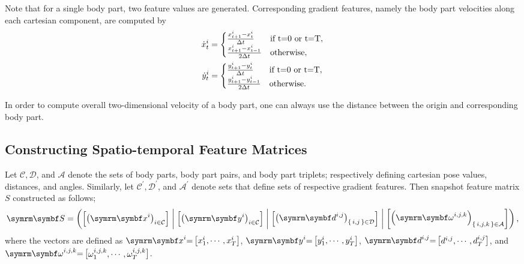 Note that for a single body part, two feature values are generated.
Corresponding gradient features, namely the body part velocities along each cartesian component, are computed by
\begin{equation}
	\begin{aligned}
		\dot{x}^{i}_t & = \begin{cases} \frac{x^{i}_{t+1} - x^{i}_{t}}{\Delta t} & \textnormal{if } $t=0$ \textnormal{ or } $t=T$, \\ \frac{x^{i}_{t+1} - x^{i}_{t-1}}{2\Delta t} & \textnormal{otherwise}, \end{cases} \\
		\dot{y}^{i}_t & = \begin{cases} \frac{y^{i}_{t+1} - y^{i}_{t}}{\Delta t} & \textnormal{if } $t=0$ \textnormal{ or } $t=T$, \\ \frac{y^{i}_{t+1} - y^{i}_{t-1}}{2\Delta t} & \textnormal{otherwise}. \end{cases}
	\end{aligned}
\end{equation}

In order to compute overall two-dimensional velocity of a body part, one can always use the distance between the origin and corresponding body part.

\subsection{Constructing Spatio-temporal Feature Matrices}
Let $\mathcal{C}, \mathcal{D}$, and $\mathcal{A}$ denote the sets of body parts, body part pairs, and body part triplets; respectively defining cartesian pose values, distances, and angles.
Similarly, let $\mathcal{C}^{\prime}, \mathcal{D}^{\prime}$, and $\mathcal{A}^{\prime}$ denote sets that define sets of respective gradient features.
Then snapshot feature matrix $S$ constructed as follows;
\begin{equation}
	\V{S} = \rbr{\qmatrix{\rbr{\V{x}^i}_{i \in \mathcal{C}}} \concat \qmatrix{\rbr{\V{y}^i}_{i \in \mathcal{C}}} \concat \qmatrix{\rbr{\V{d}^{i,j}}_{\set{i,j} \in \mathcal{D}}} \concat \qmatrix{\rbr{\V{\omega}^{i,j,k}}_{\set{i,j,k} \in \mathcal{A}}}},
\end{equation}
where the vectors are defined as $\V{x}^{i}{=}\qmatrix{x^{i}_1, \cdots, x^{i}_T}$, $\V{y}^{i}{=}\qmatrix{y^{i}_1, \cdots, y^{i}_T}$,   $\V{d}^{i,j}{=}\qmatrix{d^{i,j}, \cdots, d^{i,j}_T}$, and $\V{\omega}^{i,j,k}{=}\qmatrix{\omega_1^{i,j,k}, \cdots, \omega^{i,j,k}_T}$.

